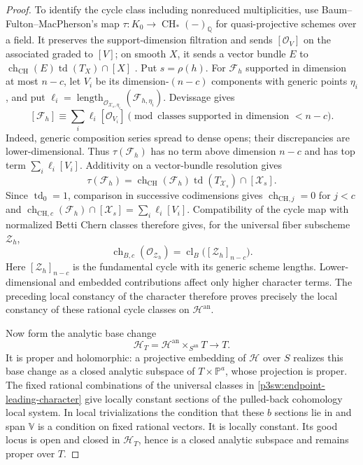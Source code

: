\documentclass[11pt]{article}
\newcommand{\Q}{\mathbb Q}
\newcommand{\CH}{\operatorname{CH}}
\numberwithin{equation}{section}
\begin{document}
\begin{proof}
To identify the cycle class including nonreduced multiplicities,
use Baum--Fulton--MacPherson's map
\(\tau:K_0\to\CH_*(-)_\Q\) for quasi-projective schemes over a
field.  It preserves the support-dimension filtration and sends
\([\mathcal O_V]\) on the associated graded to \([V]\); on smooth
\(X\), it sends a vector bundle \(E\) to
\(\operatorname{ch}_{\mathrm{CH}}(E)\operatorname{td}(T_X)\cap[X]\)
\cite[Chapter~II, Theorem, pp.~119--120; Chapter~III, Section~1,
Theorem and Lemma, pp.~128--129]{P3SWBaumFultonMacPherson1975}.
Put \(s=\rho(h)\).  For \(\mathcal F_h\) supported in dimension
at most \(n-c\), let \(V_i\) be its dimension-\((n-c)\) components
with generic points \(\eta_i\), and put
\(\ell_i=\operatorname{length}_{\mathcal O_{\mathcal X_s,\eta_i}}
(\mathcal F_{h,\eta_i})\).  Devissage gives
\[
 [\mathcal F_h]\equiv\sum_i\ell_i[\mathcal O_{V_i}]
       \pmod{\text{classes supported in dimension }<n-c}.
\]
Indeed, generic composition series spread to dense opens; their
discrepancies are lower-dimensional.  Thus \(\tau(\mathcal F_h)\)
has no term above dimension \(n-c\) and has top term
\(\sum_i\ell_i[V_i]\).  Additivity on a vector-bundle resolution gives
\[
 \tau(\mathcal F_h)
   =\operatorname{ch}_{\mathrm{CH}}(\mathcal F_h)
       \operatorname{td}(T_{\mathcal X_s})\cap[\mathcal X_s].
\]
Since \(\operatorname{td}_0=1\), comparison in successive
codimensions gives \(\operatorname{ch}_{\mathrm{CH},j}=0\) for
\(j<c\) and
\(\operatorname{ch}_{\mathrm{CH},c}(\mathcal F_h)\cap[\mathcal X_s]
=\sum_i\ell_i[V_i]\).  Compatibility of the cycle map with
normalized Betti Chern classes
\cite[Section~0.8, p.~106]{P3SWBaumFultonMacPherson1975}
therefore gives, for the universal fiber subscheme \(\mathscr Z_h\),
\begin{equation}
\label{p3sw:endpoint-leading-character}
 \operatorname{ch}_{B,c}(\mathcal O_{\mathscr Z_h})
       =\operatorname{cl}_B\bigl([\mathscr Z_h]_{n-c}\bigr).
\end{equation}
Here \([\mathscr Z_h]_{n-c}\) is the fundamental cycle with its
generic scheme lengths.  Lower-dimensional and embedded
contributions affect only higher character terms.  The preceding
local constancy of the character therefore proves precisely the
local constancy of these rational cycle classes on
\(\mathscr H^{\mathrm{an}}\).

Now form the analytic base change
\[
 \mathscr H_T=\mathscr H^{\mathrm{an}}
                 \times_{S^{\mathrm{an}}}T\longrightarrow T.
\]
It is proper and holomorphic: a projective embedding of
\(\mathscr H\) over \(S\) realizes this base change as a closed
analytic subspace of \(T\times\mathbb P^a\), whose projection
is proper.  The fixed rational combinations of the universal
classes in \eqref{p3sw:endpoint-leading-character} give locally
constant sections of the pulled-back cohomology local system.
In local trivializations the condition that these \(b\) sections
lie in and span \(\mathbb V\) is a condition on fixed rational
vectors.  It is locally constant.  Its good locus is open and
closed in \(\mathscr H_T\), hence is a closed analytic subspace
and remains proper over \(T\).


\end{proof}
\end{document}
